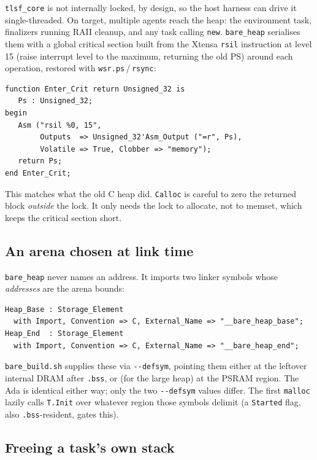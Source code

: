\texttt{tlsf\_core} is not internally locked, by design, so the host harness
can drive it single-threaded. On target, multiple agents reach the heap: the
environment task, finalizers running RAII cleanup, and any task calling
\texttt{new}. \texttt{bare\_heap} serialises them with a global critical section
built from the Xtensa \texttt{rsil} instruction at level 15 (raise interrupt
level to the maximum, returning the old PS) around each operation, restored with
\texttt{wsr.ps}\,/\,\texttt{rsync}:

\begin{lstlisting}
function Enter_Crit return Unsigned_32 is
   Ps : Unsigned_32;
begin
   Asm ("rsil %0, 15",
        Outputs  => Unsigned_32'Asm_Output ("=r", Ps),
        Volatile => True, Clobber => "memory");
   return Ps;
end Enter_Crit;
\end{lstlisting}

This matches what the old C heap did. \texttt{Calloc} is careful to zero the
returned block \emph{outside} the lock. It only needs the lock to allocate, not
to memset, which keeps the critical section short.

\subsection{An arena chosen at link time}

\texttt{bare\_heap} never names an address. It imports two linker symbols whose
\emph{addresses} are the arena bounds:

\begin{lstlisting}
Heap_Base : Storage_Element
  with Import, Convention => C, External_Name => "__bare_heap_base";
Heap_End  : Storage_Element
  with Import, Convention => C, External_Name => "__bare_heap_end";
\end{lstlisting}

\texttt{bare\_build.sh} supplies these via \texttt{-{}-defsym}, pointing them
either at the leftover internal DRAM after \texttt{.bss}, or (for the large
heap) at the PSRAM region. The Ada is identical either way; only the two
\texttt{-{}-defsym} values differ. The first \texttt{malloc} lazily calls
\texttt{T.Init} over whatever region those symbols delimit (a \texttt{Started}
flag, also \texttt{.bss}-resident, gates this).

\subsection{Freeing a task's own stack}

